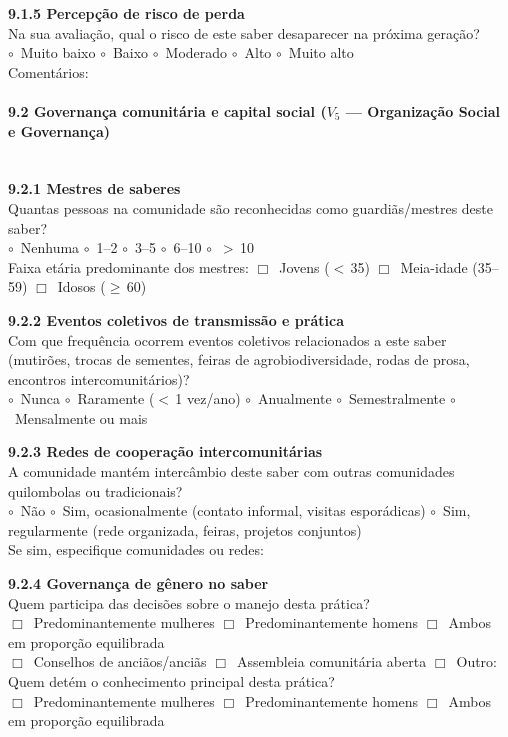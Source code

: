 \medskip\noindent\textbf{9.1.5 Percepção de risco de perda}\\[2pt]
Na sua avaliação, qual o risco de este saber desaparecer na próxima geração?\\
$\circ$~Muito baixo \quad $\circ$~Baixo \quad $\circ$~Moderado \quad $\circ$~Alto \quad $\circ$~Muito alto\\[2pt]
Comentários: \dotfill

\paragraph{9.2 Governança comunitária e capital social ($V_5$ --- Organização Social e Governança)}~\\[4pt]

\textbf{9.2.1 Mestres de saberes}\\[2pt]
Quantas pessoas na comunidade são reconhecidas como guardiãs/mestres deste saber?\\
$\circ$~Nenhuma \quad $\circ$~1--2 \quad $\circ$~3--5 \quad $\circ$~6--10 \quad $\circ$~$>$\,10\\[2pt]
Faixa etária predominante dos mestres: $\Box$~Jovens ($<$\,35) \quad $\Box$~Meia-idade (35--59) \quad $\Box$~Idosos ($\geq$\,60)

\medskip\noindent\textbf{9.2.2 Eventos coletivos de transmissão e prática}\\[2pt]
Com que frequência ocorrem eventos coletivos relacionados a este saber (mutirões, trocas de sementes, feiras de agrobiodiversidade, rodas de prosa, encontros intercomunitários)?\\
$\circ$~Nunca \quad $\circ$~Raramente ($<$\,1 vez/ano) \quad $\circ$~Anualmente \quad $\circ$~Semestralmente \quad $\circ$~Mensalmente ou mais

\medskip\noindent\textbf{9.2.3 Redes de cooperação intercomunitárias}\\[2pt]
A comunidade mantém intercâmbio deste saber com outras comunidades quilombolas ou tradicionais?\\
$\circ$~Não \quad $\circ$~Sim, ocasionalmente (contato informal, visitas esporádicas) \quad $\circ$~Sim, regularmente (rede organizada, feiras, projetos conjuntos)\\[2pt]
Se sim, especifique comunidades ou redes: \dotfill

\medskip\noindent\textbf{9.2.4 Governança de gênero no saber}\\[2pt]
Quem participa das decisões sobre o manejo desta prática?\\
$\Box$~Predominantemente mulheres \quad $\Box$~Predominantemente homens \quad $\Box$~Ambos em proporção equilibrada\\
$\Box$~Conselhos de anciãos/anciãs \quad $\Box$~Assembleia comunitária aberta \quad $\Box$~Outro: \dotfill\\[4pt]
Quem detém o conhecimento principal desta prática?\\
$\Box$~Predominantemente mulheres \quad $\Box$~Predominantemente homens \quad $\Box$~Ambos em proporção equilibrada

